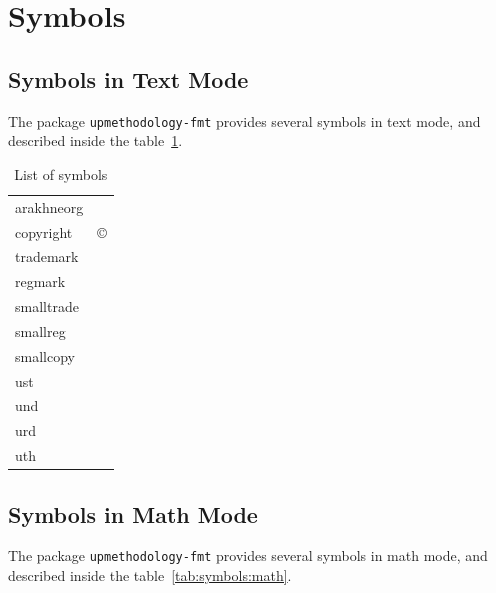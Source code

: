 \documentclass[book,taskpackage,specpackage,codepackage]{upmethodology-document}
\begin{document}
\section{Symbols}

\subsection{Symbols in Text Mode}

The package \texttt{upmethodology-fmt} provides several symbols in text mode, and described inside the table~\ref{tab:symbols:text}.

\begin{table}[ht]
	\begin{center}
		\begin{tabular}{|>{\ttfamily}l|l|}
		\hline
		{\textbackslash}arakhneorg & \arakhneorg \\
		{\textbackslash}copyright & \copyright \\
		{\textbackslash}trademark & \trademark \\
		{\textbackslash}regmark & \regmark \\
		{\textbackslash}smalltrade & \smalltrade \\
		{\textbackslash}smallreg & \smallreg \\
		{\textbackslash}smallcopy & \smallcopy \\
		{\textbackslash}ust & \ust \\
		{\textbackslash}und & \und \\
		{\textbackslash}urd & \urd \\
		{\textbackslash}uth & \uth \\
		\hline
		\end{tabular}
	\end{center}
	\caption{List of symbols}
	\label{tab:symbols:text}
\end{table}

\subsection{Symbols in Math Mode}

The package \texttt{upmethodology-fmt} provides several symbols in math mode, and described inside the table~\ref{tab:symbols:math}.
\end{document}
